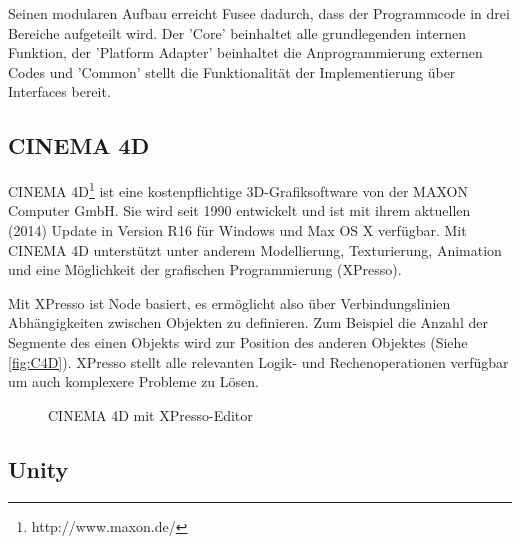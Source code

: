 Seinen modularen Aufbau erreicht Fusee dadurch, dass der Programmcode in drei Bereiche aufgeteilt wird. Der 'Core' beinhaltet alle grundlegenden internen Funktion, der 'Platform Adapter' beinhaltet die Anprogrammierung externen Codes und 'Common' stellt die Funktionalität der Implementierung über Interfaces bereit.

\subsection{CINEMA 4D}
\label{sec:c4d}

CINEMA 4D\footnote{http://www.maxon.de/} ist eine kostenpflichtige 3D-Grafiksoftware von der MAXON Computer GmbH. Sie wird seit 1990 entwickelt und ist mit ihrem aktuellen (2014) Update in Version R16 für Windows und Max OS X verfügbar. Mit CINEMA 4D unterstützt unter anderem Modellierung, Texturierung, Animation und eine Möglichkeit der grafischen Programmierung (XPresso).

Mit XPresso ist Node basiert, es ermöglicht also über Verbindungslinien Abhängigkeiten zwischen Objekten zu definieren. Zum Beispiel die Anzahl der Segmente des einen Objekts wird zur Position des anderen Objektes (Siehe \autoref{fig:C4D}). XPresso stellt alle relevanten Logik- und Rechenoperationen verfügbar um auch komplexere Probleme zu Lösen.
\begin{figure}[htbp]
  \centering
  \caption{CINEMA 4D mit XPresso-Editor}
  \label{fig:C4D}
\end{figure}

\subsection{Unity}
\label{sec:unity}

